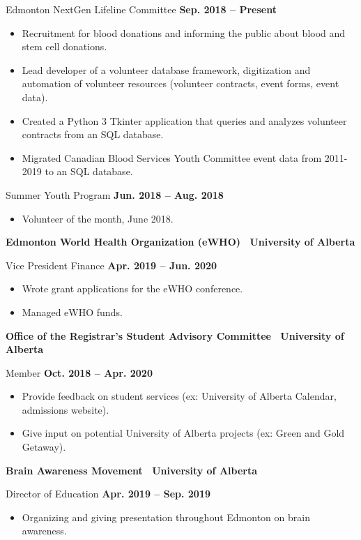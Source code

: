 \documentclass{article}
\begin{document}
    Edmonton NextGen Lifeline Committee \hfill \textbf{Sep. 2018 -- Present}
    \begin{itemize}
        \item Recruitment for blood donations and informing the public about blood and stem cell donations.
        \item Lead developer of a volunteer database framework, digitization and automation of volunteer resources (volunteer contracts, event forms, event data).
        \item Created a Python 3 Tkinter application that queries and analyzes volunteer contracts from an SQL database.
        \item Migrated Canadian Blood Services Youth Committee event data from 2011-2019 to an SQL database.
    \end{itemize}

    Summer Youth Program \hfill \textbf{Jun. 2018 -- Aug. 2018}
    \begin{itemize}
        \item Volunteer of the month, June 2018.
    \end{itemize}
    
    
    \textbf{Edmonton World Health Organization (eWHO) \textbar\ University of Alberta}

    Vice President Finance \hfill \textbf{Apr. 2019 -- Jun. 2020}
    \begin{itemize}
        \item Wrote grant applications for the eWHO conference.
        \item Managed eWHO funds.
    \end{itemize}
    

    \textbf{Office of the Registrar's  Student Advisory Committee \textbar\ University of Alberta}

    Member \hfill \textbf{Oct. 2018 -- Apr. 2020}
    \begin{itemize}
        \item Provide feedback on student services (ex: University of Alberta Calendar, admissions website).
        \item Give input on potential University of Alberta projects (ex: Green and Gold Getaway).
    \end{itemize}


    \textbf{Brain Awareness Movement \textbar\ University of Alberta}

    Director of Education \hfill \textbf{Apr. 2019 -- Sep. 2019}
    \begin{itemize}
        \item Organizing and giving presentation throughout Edmonton on brain awareness.
    \end{itemize}
\end{document}
